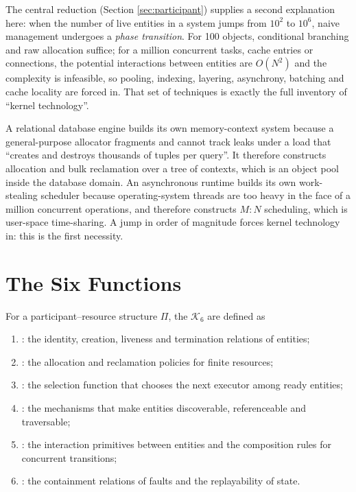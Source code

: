 The central reduction (Section \ref{sec:participant}) supplies a second explanation here:
when the number of live entities in a system jumps from $10^{2}$ to $10^{6}$, naive
management undergoes a \emph{phase transition}. For 100 objects, conditional branching and
raw allocation suffice; for a million concurrent tasks, cache entries or connections, the
potential interactions between entities are $O(N^{2})$ and the complexity is infeasible, so
pooling, indexing, layering, asynchrony, batching and cache locality are forced in. That set
of techniques is exactly the full inventory of ``kernel technology''.

\begin{example}\label{ex:pg-memctx}
A relational database engine builds its own memory-context system because a
general-purpose allocator fragments and cannot track leaks under a load that ``creates and
destroys thousands of tuples per query''. It therefore constructs allocation and bulk
reclamation over a tree of contexts, which is an object pool inside the database domain. An
asynchronous runtime builds its own work-stealing scheduler because operating-system threads
are too heavy in the face of a million concurrent operations, and therefore constructs
$M{:}N$ scheduling, which is user-space time-sharing. A jump in order of magnitude forces
kernel technology in: this is the first necessity.
\end{example}

\section{The Six Functions}\label{sec:six}

\begin{definition}\label{def:six}
For a participant--resource structure $\Pi$, the  $\mathcal{K}_6$ are
defined as
\begin{enumerate}[label=(F\arabic*)]
\item {}: the identity, creation, liveness and termination
      relations of entities;
\item {}: the allocation and reclamation policies for finite
      resources;
\item {}: the selection function that chooses the next executor among ready
      entities;
\item {}: the mechanisms that make entities discoverable,
      referenceable and traversable;
\item {}: the interaction primitives between entities
      and the composition rules for concurrent transitions;
\item {}: the containment relations of faults and the
      replayability of state.
\end{enumerate}
\end{definition}


